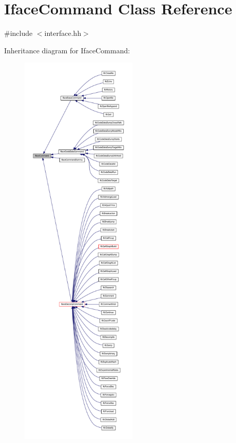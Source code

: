 \hypertarget{class_iface_command}{}\section{Iface\+Command Class Reference}
\label{class_iface_command}


{\ttfamily \#include $<$interface.\+hh$>$}



Inheritance diagram for Iface\+Command\+:
\nopagebreak
\begin{figure}[H]
\begin{center}
\leavevmode
\includegraphics[height=550pt]{class_iface_command__inherit__graph}
\end{center}
\end{figure}
